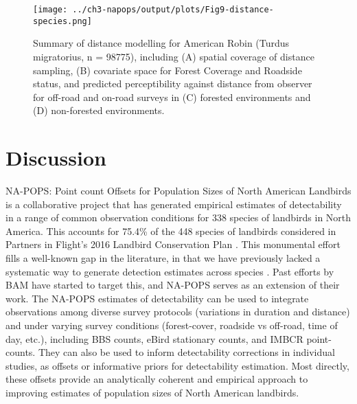 \begin{figure}[h]
	\centering
	\texttt{[image: ../ch3-napops/output/plots/Fig9-distance-species.png]}
	\caption{\label{fig:ch1-distance-species}Summary of distance modelling for American Robin (Turdus migratorius, n = 98775), including (A) spatial coverage of distance sampling, (B) covariate space for Forest Coverage and Roadside status, and predicted perceptibility against distance from observer for off-road and on-road surveys in (C) forested environments and (D) non-forested environments. }
\end{figure}

\section{Discussion}

\par NA-POPS: Point count Offsets for Population Sizes of North American Landbirds is a collaborative project that has generated empirical estimates of detectability in a range of common observation conditions for 338 species of landbirds in North America. This accounts for 75.4\% of the 448 species of landbirds considered in Partners in Flight’s 2016 Landbird Conservation Plan \citep{rosenberg_partners_2016}. This monumental effort fills a well-known gap in the literature, in that we have previously lacked a systematic way to generate detection estimates across species \citep{stanton_estimating_2019}. Past efforts by BAM \citep{matsuoka_using_2012, solymos_calibrating_2013, solymos_evaluating_2018} have started to target this, and NA-POPS serves as an extension of their work. The NA-POPS estimates of detectability can be used to integrate observations among diverse survey protocols (variations in duration and distance) and under varying survey conditions (forest-cover, roadside vs off-road, time of day, etc.), including BBS counts, eBird stationary counts, and IMBCR point-counts. They can also be used to inform detectability corrections in individual studies, as offsets or informative priors for detectability estimation. Most directly, these offsets provide an analytically coherent and empirical approach to improving estimates of population sizes of North American landbirds. 

